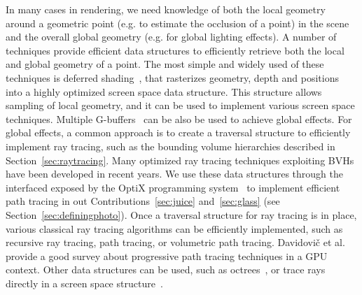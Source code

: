In many cases in rendering, we need knowledge of both the local geometry around a geometric point (e.g. to estimate the occlusion of a point) in the scene and the overall global geometry (e.g. for global lighting effects). A number of techniques provide efficient data structures to efficiently retrieve both the local and global geometry of a point. The most simple and widely used of these techniques is deferred shading~\cite{Saito1990}, that rasterizes geometry, depth and positions into a highly optimized screen space data structure. This structure allows sampling of local geometry, and it can be used to implement various screen space techniques. Multiple G-buffers~\cite{Mara2016} can be also be used to achieve global effects. For global effects, a common approach is to create a traversal structure to efficiently implement ray tracing, such as the bounding volume hierarchies described in Section~\ref{sec:raytracing}. Many optimized ray tracing techniques exploiting BVHs have been developed in recent years. We use these data structures through the interfaced exposed by the OptiX programming system~\cite{Parker2010} to implement efficient path tracing in out Contributions~\ref{sec:juice} and~\ref{sec:glass} (see Section~\ref{sec:definingphoto}). Once a traversal structure for ray tracing is in place, various classical ray tracing algorithms can be efficiently implemented, such as recursive ray tracing, path tracing, or volumetric path tracing. Davidovi\v{c} et al.~\cite{Davidovic2014} provide a good survey about progressive path tracing techniques in a GPU context. Other data structures can be used, such as octrees~\cite{Havran2000}, or trace rays directly in a screen space structure~\cite{Tanaka1986,McGuire2014, Widmer2015}. 

